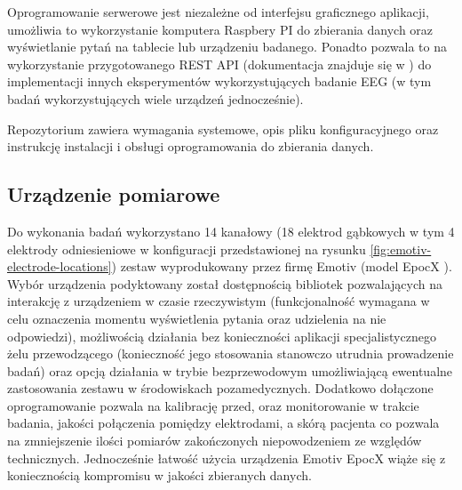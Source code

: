 \documentclass{./assets/wfis}
\begin{document}
Oprogramowanie serwerowe jest niezależne od interfejsu graficznego aplikacji, umożliwia to wykorzystanie komputera Raspbery PI do zbierania danych oraz wyświetlanie pytań na tablecie lub urządzeniu badanego.
Ponadto pozwala to na wykorzystanie przygotowanego REST API (dokumentacja znajduje się w  \cite{mateusz_kojro_mateuszkojrobachelors-thesis_nodate}) do implementacji innych eksperymentów wykorzystujących badanie EEG (w tym badań wykorzystujących wiele urządzeń jednocześnie). 

Repozytorium \cite{mateusz_kojro_mateuszkojrobachelors-thesis_nodate} zawiera wymagania systemowe, opis pliku konfiguracyjnego oraz instrukcję instalacji i obsługi oprogramowania do zbierania danych.
\clearpage

\subsection{Urządzenie pomiarowe}\label{emotiv}
Do wykonania badań wykorzystano 14 kanałowy (18 elektrod gąbkowych w tym 4 elektrody odniesieniowe w konfiguracji przedstawionej na rysunku \ref{fig:emotiv-electrode-locations}) zestaw wyprodukowany przez firmę Emotiv (model EpocX \cite{emotiv_inc_epoc_nodate}). Wybór urządzenia podyktowany został dostępnością bibliotek pozwalających na interakcję z urządzeniem w czasie rzeczywistym \cite{emotiv_inc_emotiv_nodate-1} (funkcjonalność wymagana w celu oznaczenia momentu wyświetlenia pytania oraz udzielenia na nie odpowiedzi), możliwością działania bez konieczności aplikacji specjalistycznego żelu przewodzącego (konieczność jego stosowania stanowczo utrudnia prowadzenie badań) oraz opcją działania w trybie bezprzewodowym umożliwiającą ewentualne zastosowania zestawu w środowiskach pozamedycznych. Dodatkowo dołączone oprogramowanie pozwala na kalibrację przed, oraz monitorowanie w trakcie badania, jakości połączenia pomiędzy elektrodami, a skórą pacjenta co pozwala na zmniejszenie ilości pomiarów zakończonych niepowodzeniem ze względów technicznych. Jednocześnie łatwość użycia urządzenia Emotiv EpocX wiąże się z koniecznością kompromisu w jakości zbieranych danych. 

\end{document}
